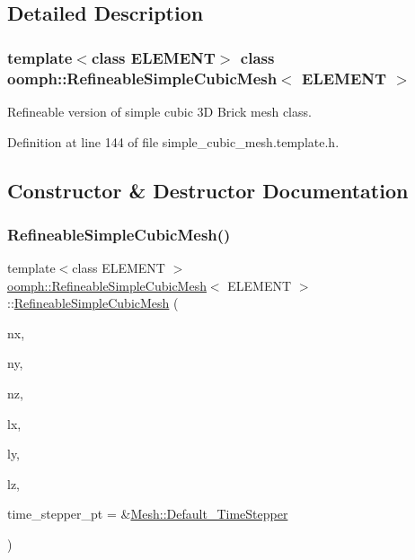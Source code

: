 \subsection{Detailed Description}
\subsubsection*{template$<$class E\+L\+E\+M\+E\+NT$>$\newline
class oomph\+::\+Refineable\+Simple\+Cubic\+Mesh$<$ E\+L\+E\+M\+E\+N\+T $>$}

Refineable version of simple cubic 3D Brick mesh class. 

Definition at line 144 of file simple\+\_\+cubic\+\_\+mesh.\+template.\+h.



\subsection{Constructor \& Destructor Documentation}
\mbox{\label{classoomph_1_1RefineableSimpleCubicMesh_a71fab83f3bdc3f0cf7676afb5e313d10}} 
\subsubsection{\texorpdfstring{Refineable\+Simple\+Cubic\+Mesh()}{RefineableSimpleCubicMesh()}\hspace{0.1cm}{\footnotesize\ttfamily [1/2]}}
{\footnotesize\ttfamily template$<$class E\+L\+E\+M\+E\+NT $>$ \\
\hyperlink{classoomph_1_1RefineableSimpleCubicMesh}{oomph\+::\+Refineable\+Simple\+Cubic\+Mesh}$<$ E\+L\+E\+M\+E\+NT $>$\+::\hyperlink{classoomph_1_1RefineableSimpleCubicMesh}{Refineable\+Simple\+Cubic\+Mesh} (\begin{DoxyParamCaption}\item[{const unsigned \&}]{nx,  }\item[{const unsigned \&}]{ny,  }\item[{const unsigned \&}]{nz,  }\item[{const double \&}]{lx,  }\item[{const double \&}]{ly,  }\item[{const double \&}]{lz,  }\item[{\hyperlink{classoomph_1_1TimeStepper}{Time\+Stepper} $\ast$}]{time\+\_\+stepper\+\_\+pt = {\ttfamily \&\hyperlink{classoomph_1_1Mesh_a12243d0fee2b1fcee729ee5a4777ea10}{Mesh\+::\+Default\+\_\+\+Time\+Stepper}} }\end{DoxyParamCaption})\hspace{0.3cm}{\ttfamily [inline]}}



